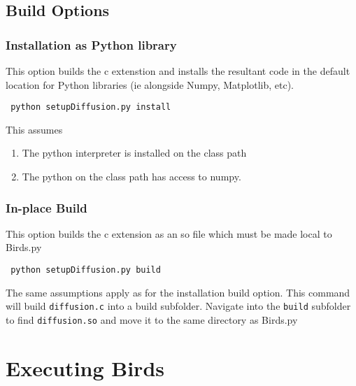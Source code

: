 \documentclass[a4paper,10pt]{article}
\begin{document}
\subsection{Build Options}
 \subsubsection{Installation as Python library} This option builds the c extenstion and installs the resultant code in the default location for Python libraries (ie alongside Numpy, Matplotlib, etc). \begin{verbatim} python setupDiffusion.py install\end{verbatim} This assumes \begin{enumerate} \item The python interpreter is installed on the class path \item The python on the class path has access to numpy.
                                                                                                                                                                                                                                                                             \end{enumerate}
  \subsubsection{In-place Build} This option builds the c extension as an so file which must be made local to Birds.py
 \begin{verbatim} python setupDiffusion.py build \end{verbatim}  The same assumptions apply as for the installation build option. This command will build \verb+diffusion.c+ into a build subfolder.  Navigate into the \verb+build+ subfolder to find \verb+diffusion.so+ and move it to the same directory as Birds.py



\section{Executing Birds}
\end{document}
